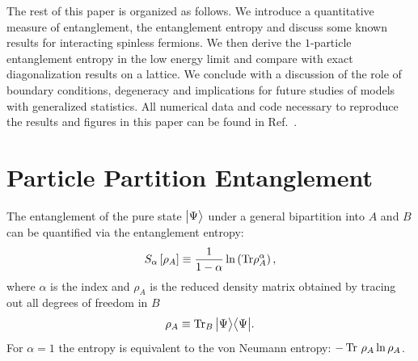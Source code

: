 The rest of this paper is organized as follows. We introduce a quantitative
measure of entanglement, the \ren entanglement entropy and discuss some known
results for interacting spinless fermions.  We then derive the $1$-particle
entanglement entropy in the low energy limit and compare with exact
diagonalization results on a lattice.  We conclude with a discussion of the role
of boundary conditions, degeneracy and implications for future studies of
models with generalized statistics. All numerical data and code necessary to reproduce
the results and figures in this paper can be found in Ref.~\cite{repo}.

\section{Particle Partition Entanglement}

The entanglement of the pure state $\bigl \vert \Psi \bigr \rangle$ under a general bipartition
into $A$ and $B$ can be quantified via the \ren entanglement entropy:
%
\begin{equation}
S_{\alpha}\left[ \rho_A \right] \equiv \frac{1}{1-\alpha} \ln \left({ {\rm Tr} 
\rho_A^{\alpha} }\right), 
\label{eq:renyi}
\end{equation}
%
where $\alpha$ is the \ren index and $\rho_A$ is the reduced density matrix
obtained by tracing out all degrees of freedom in $B$
%
\begin{equation}
    \rho_A \equiv {\operatorname{Tr}}_{B}\, \bigl \vert \Psi \bigr \rangle\bigl \langle \Psi \bigr \vert.
\end{equation}
%
For $\alpha = 1$ the \ren entropy is equivalent to the von Neumann
entropy: $-\operatorname{Tr}\, \rho_A \ln \rho_A$.

